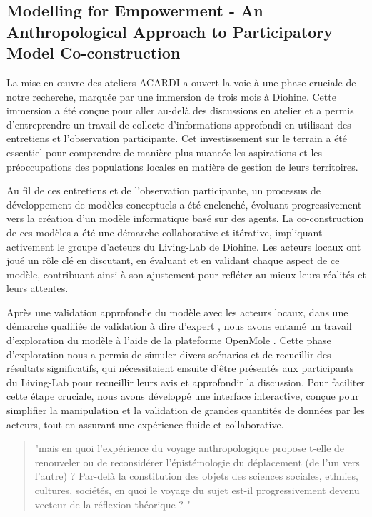 \documentclass{article}
\begin{document}
\subsection{Modelling for Empowerment - An Anthropological Approach to Participatory Model Co-construction}

La mise en œuvre des ateliers ACARDI a ouvert la voie à une phase cruciale de notre recherche, marquée par une immersion de trois mois à Diohine. Cette immersion a été conçue pour aller au-delà des discussions en atelier et a permis d'entreprendre un travail de collecte d'informations approfondi en utilisant des entretiens et l'observation participante. Cet investissement sur le terrain a été essentiel pour comprendre de manière plus nuancée les aspirations et les préoccupations des populations locales en matière de gestion de leurs territoires.

Au fil de ces entretiens et de l'observation participante, un processus de développement de modèles conceptuels a été enclenché, évoluant progressivement vers la création d'un modèle informatique basé sur des agents. La co-construction de ces modèles a été une démarche collaborative et itérative, impliquant activement le groupe d'acteurs du Living-Lab de Diohine. Les acteurs locaux ont joué un rôle clé en discutant, en évaluant et en validant chaque aspect de ce modèle, contribuant ainsi à son ajustement pour refléter au mieux leurs réalités et leurs attentes.

Après une validation approfondie du modèle avec les acteurs locaux, dans une démarche qualifiée de validation à dire d'expert \cite{bommel_definition_2009}, nous avons entamé un travail d'exploration du modèle à l'aide de la plateforme OpenMole \cite{reuillon_openmole_2013}. Cette phase d'exploration nous a permis de simuler divers scénarios et de recueillir des résultats significatifs, qui nécessitaient ensuite d'être présentés aux participants du Living-Lab pour recueillir leurs avis et approfondir la discussion. Pour faciliter cette étape cruciale, nous avons développé une interface interactive, conçue pour simplifier la manipulation et la validation de grandes quantités de données par les acteurs, tout en assurant une expérience fluide et collaborative.

\begin{quote}
"mais en quoi l’expérience du voyage anthropologique propose t-elle de renouveler ou de reconsidérer l’épistémologie du déplacement (de l’un vers l’autre) ? Par-delà la constitution des objets des sciences sociales, ethnies, cultures, sociétés, en quoi le voyage du sujet est-il progressivement devenu vecteur de la réflexion théorique ? "
\end{quote}
\end{document}
